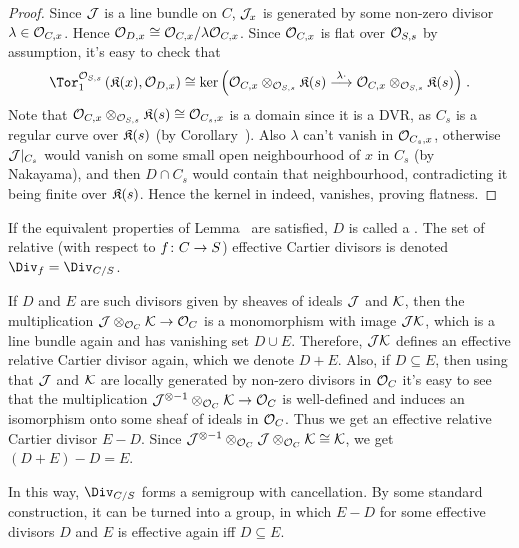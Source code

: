 \documentclass[a4paper,parskip=half,numbers=enddot, DIV=12]{scrreprt}
\begin{document}
\begin{proof}
	Since $\mathcal{J}$ is a line bundle on $C$, $\mathcal{J}_x$ is generated by some non-zero divisor $\lambda\in\mathcal{O}_{C,x}$. Hence $\mathcal{O}_{D,x}\cong \mathcal{O}_{C,x}/\lambda\mathcal{O}_{C,x}$. Since $\mathcal{O}_{C,x}$ is flat over $\mathcal{O}_{S,s}$ by assumption, it's easy to check that
	\begin{align}\lbl{eq:TorKer}
		\Tor_1^{\Oo_{S,s}}\left(\KK(x),\Oo_{D,x}\right)\cong \ker\Big(\Oo_{C,x}\otimes_{\Oo_{S,s}}\KK(s)\morphism[\lambda\cdot]\Oo_{C,x}\otimes_{\Oo_{S,s}}\KK(s)\Big)\;.
	\end{align}
	Note that $\mathcal{O}_{C,x}\otimes_{\mathcal{O}_{S,s}}\mathfrak{K}(s)\cong \mathcal{O}_{C_s,x}$ is a domain since it is a DVR, as $C_s$ is a regular curve over $\mathfrak{K}(s)$ (by Corollary~). Also $\lambda$ can't vanish in $\mathcal{O}_{C_s,x}$, otherwise $\mathcal{J}|_{C_s}$ would vanish on some small open neighbourhood of $x$ in $C_s$ (by Nakayama), and then $D\cap C_s$ would contain that neighbourhood, contradicting it being finite over $\mathfrak{K}(s)$. Hence the kernel in  indeed, vanishes, proving flatness.
\end{proof}
\begin{defi}
	If the equivalent properties of Lemma~ are satisfied, $D$ is called a . The set of relative (with respect to $f\colon C\morphism S$) effective Cartier divisors is denoted $\Div_f=\Div_{C/S}$.
\end{defi}
\begin{rem}
	If $D$ and $E$ are such divisors given by sheaves of ideals $\mathcal{J}$ and $\mathcal{K}$, then the multiplication $\Jj\otimes_{\Oo_C}\Kk \morphism\Oo_C$ is a monomorphism with image $\mathcal{J}\mathcal{K}$, which is a line bundle again and has vanishing set $D\cup E$. Therefore, $\mathcal{J}\mathcal{K}$ defines an effective relative Cartier divisor again, which we denote $D+E$. Also, if $D\subseteq E$, then using that $\mathcal{J}$ and $\mathcal{K}$ are locally generated by non-zero divisors in $\mathcal{O}_C$ it's easy to see that the multiplication $\Jj^{\otimes -1}\otimes_{\Oo_C}\Kk\morphism \Oo_C$ is well-defined and induces an isomorphism onto some sheaf of ideals in $\mathcal{O}_C$. Thus we get an effective relative Cartier divisor $E-D$. Since $\mathcal{J}^{\otimes -1}\otimes_{\mathcal{O}_C}\mathcal{J}\otimes_{\mathcal{O}_C}\mathcal{K}\cong \mathcal{K}$, we get $(D+E)-D=E$.
		
	In this way, $\Div_{C/S}$ forms a semigroup with cancellation. By some standard construction, it can be turned into a group, in which $E-D$ for some effective divisors $D$ and $E$ is effective again iff $D\subseteq E$.
\end{rem}
\end{document}
